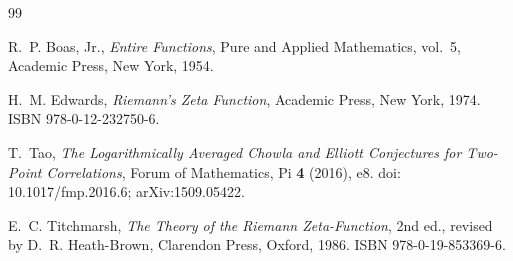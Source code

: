 \documentclass[11pt]{amsart}
\numberwithin{equation}{section}
\theoremstyle{plain}
\theoremstyle{definition}
\theoremstyle{remark}
\begin{document}
\begin{thebibliography}{99}

R.~P. Boas, Jr.,
\emph{Entire Functions},
Pure and Applied Mathematics, vol.~5,
Academic Press, New York, 1954.

H.~M. Edwards,
\emph{Riemann's Zeta Function},
Academic Press, New York, 1974.
ISBN 978-0-12-232750-6.

T.~Tao,
\emph{The Logarithmically Averaged Chowla and Elliott Conjectures for Two-Point Correlations},
Forum of Mathematics, Pi \textbf{4} (2016), e8.
doi: 10.1017/fmp.2016.6; arXiv:1509.05422.

E.~C. Titchmarsh,
\emph{The Theory of the Riemann Zeta-Function},
2nd ed., revised by D.~R. Heath-Brown,
Clarendon Press, Oxford, 1986.
ISBN 978-0-19-853369-6.

\end{thebibliography}
\end{document}
